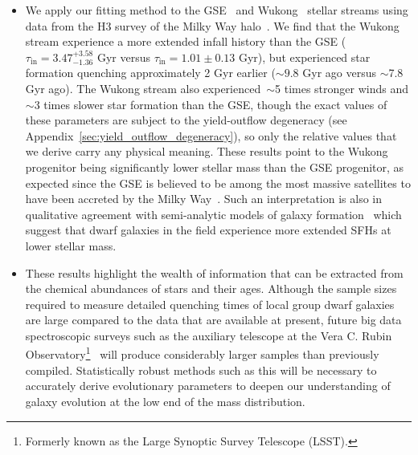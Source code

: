\documentclass[ms.tex]{subfiles}
\begin{document}
\begin{itemize}
	\item We apply our fitting method to the GSE~\citep{Belokurov2018,
	Helmi2018} and Wukong~\citep{Naidu2020, Naidu2022} stellar streams using
	data from the H3 survey of the Milky Way halo~\citep{Conroy2019}.
	We find that the Wukong stream experience a more extended infall history
	than the GSE ($\tau_\text{in} = 3.47^{+3.58}_{-1.36}$ Gyr versus
	$\tau_\text{in} = 1.01 \pm 0.13$ Gyr), but experienced star formation
	quenching approximately 2 Gyr earlier ($\sim9.8$ Gyr ago versus
	$\sim$7.8 Gyr ago).
	The Wukong stream also experienced~$\sim$5 times stronger winds and
	$\sim$3 times slower star formation than the GSE, though the exact values
	of these parameters are subject to the yield-outflow degeneracy (see
	Appendix~\ref{sec:yield_outflow_degeneracy}), so only the relative values
	that we derive carry any physical meaning.
	These results point to the Wukong progenitor being significantly lower
	stellar mass than the GSE progenitor, as expected since the GSE is believed
	to be among the most massive satellites to have been accreted by the Milky
	Way~\citep{Myeong2018, Deason2019, Fattahi2019, Mackereth2019,
	Vincenzo2019}.
	Such an interpretation is also in qualitative agreement with semi-analytic
	models of galaxy formation~\citep[e.g.][]{Baugh2005, Baugh2006, Bower2006,
	Benson2012, Somerville2015a, Somerville2015b, Croton2016, Behroozi2019}
	which suggest that dwarf galaxies in the field experience more extended
	SFHs at lower stellar mass.

	\item These results highlight the wealth of information that can be
	extracted from the chemical abundances of stars and their ages.
	Although the sample sizes required to measure detailed quenching times of
	local group dwarf galaxies are large compared to the data that are
	available at present, future big data spectroscopic surveys such as the
	auxiliary telescope at the Vera C. Rubin Observatory\footnote{
		Formerly known as the Large Synoptic Survey Telescope (LSST).
	}~\citep{Ivezic2019} will produce considerably larger samples than
	previously compiled.
	Statistically robust methods such as this will be necessary to accurately
	derive evolutionary parameters to deepen our understanding of galaxy
	evolution at the low end of the mass distribution.

\end{itemize}
\end{document}
